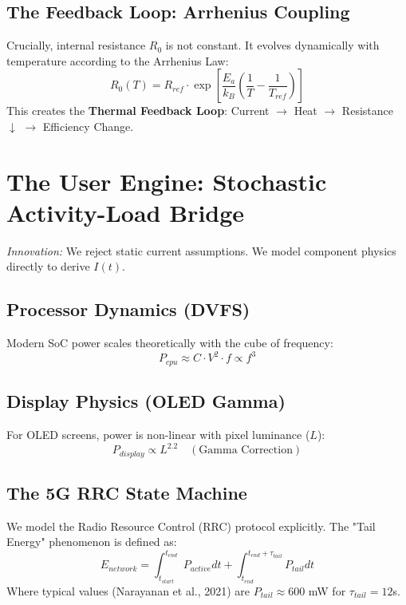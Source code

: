 \documentclass[12pt]{article}
\begin{document}
\subsection{The Feedback Loop: Arrhenius Coupling}
Crucially, internal resistance $R_0$ is not constant. It evolves dynamically with temperature according to the Arrhenius Law:
\begin{equation}
    R_0(T) = R_{ref} \cdot \exp\left[ \frac{E_a}{k_B} \left( \frac{1}{T} - \frac{1}{T_{ref}} \right) \right]
\end{equation}
This creates the \textbf{Thermal Feedback Loop}: Current $\to$ Heat $\to$ Resistance $\downarrow$ $\to$ Efficiency Change.

\section{The User Engine: Stochastic Activity-Load Bridge}
\textit{Innovation:} We reject static current assumptions. We model component physics directly to derive $I(t)$.

\subsection{Processor Dynamics (DVFS)}
Modern SoC power scales theoretically with the cube of frequency:
\begin{equation}
    P_{cpu} \approx C \cdot V^2 \cdot f \propto f^3
\end{equation}

\subsection{Display Physics (OLED Gamma)}
For OLED screens, power is non-linear with pixel luminance ($L$):
\begin{equation}
    P_{display} \propto L^{2.2} \quad (\text{Gamma Correction})
\end{equation}

\subsection{The 5G RRC State Machine}
We model the Radio Resource Control (RRC) protocol explicitly. The "Tail Energy" phenomenon is defined as:
\begin{equation}
    E_{network} = \int_{t_{start}}^{t_{end}} P_{active} dt + \int_{t_{end}}^{t_{end}+\tau_{tail}} P_{tail} dt
\end{equation}
Where typical values (Narayanan et al., 2021) are $P_{tail} \approx 600$ mW for $\tau_{tail} = 12$s.
\end{document}
